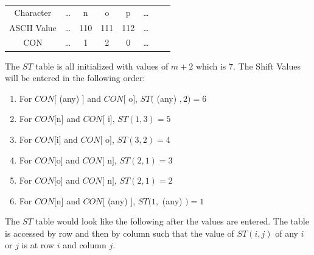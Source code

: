 \begin{center}
\begin{tabular}{ c c c c c c c c }
 Character & \ldots & n & o & p & \ldots \\ 
 ASCII Value & \ldots & 110 & 111 & 112 & \ldots \\  
 CON & \ldots & 1 & 2 & 0 & \ldots   
\end{tabular}
\end{center}

The $ST$ table is all initialized with values of $m+2$ which is $7$. The Shift Values will be entered in the following order:
\begin{enumerate}
\item For $CON[$ (any) $]$ and $CON[$ o$]$, $ST($ (any) $,2) = 6$
\item For $CON[$n$]$ and $CON[$ i$]$, $ST(1,3) = 5$
\item For $CON[$i$]$ and $CON[$ o$]$, $ST(3,2) = 4$
\item For $CON[$o$]$ and $CON[$ n$]$, $ST(2,1) = 3$
\item For $CON[$o$]$ and $CON[$ n$]$, $ST(2,1) = 2$
\item For $CON[$n$]$ and $CON[$ (any) $]$, $ST(1, $ (any) $) = 1$
\end{enumerate}
The $ST$ table would look like the following after the values are entered. The table is accessed by row and then by column such that the value of $ST(i,j)$ of any $i$ or $j$ is at row $i$ and column $j$. \\


